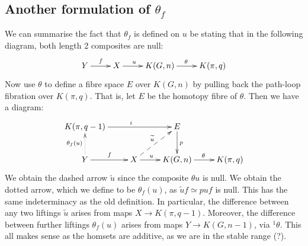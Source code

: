 \documentclass[11pt]{article}
\begin{document}
\subsection{Another formulation of \texorpdfstring{$\theta_f$}{theta f}}
We can summarise the fact that $\theta_f$ is defined on $u$ be stating that in
the following diagram, both length 2 composites are null:
\[\xymatrix{
Y\ar[r]^f&X\ar[r]^{u\ \ \ }&K(G,n)\ar[r]^\theta&K(\pi,q)
}\]
Now use $\theta$ to define a fibre space $E$ over $K(G,n)$ by pulling back the
path-loop fibration over $K(\pi,q)$. That is, let $E$ be the homotopy fibre of
$\theta$. Then we have a diagram:
\[\xymatrix{
K(\pi,q-1)\ar[rr]^i&&E\ar[d]^p\\
Y\ar[r]^f\ar@{.>}[u]^{\theta_f(u)}&
X\ar[r]^{u\ \ \ }\ar@{-->}[ru]^{\widetilde u}&
K(G,n)\ar[r]^\theta&K(\pi,q)
}\]
We obtain the dashed arrow $\widetilde u$ since the composite $\theta u$ is
null. We obtain the dotted arrow, which we define to be $\theta_f(u)$, as
$\widetilde u f\simeq puf$ is null. This has the same indeterminacy as the old
definition. In particular, the difference between any two liftings
$\widetilde u$ arises from maps $X\to K(\pi,q-1)$. Moreover, the difference
between further liftings $\theta_f(u)$ arises from maps 
$Y\to K(G,n-1)$, via $^1\theta$. This all makes sense as the homsets are
additive, as we are in the stable range (?).
\end{document}

